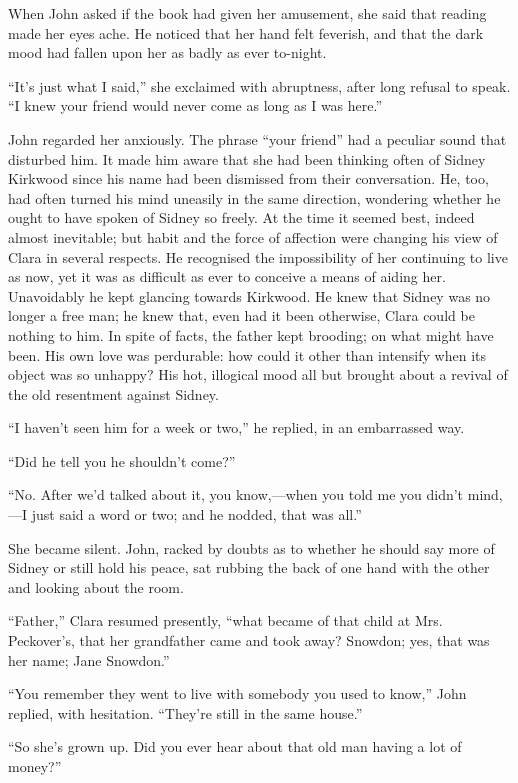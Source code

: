 When John asked if the book had given her amusement, she said that
reading made her eyes ache. He noticed that her hand felt feverish, and
that the dark mood had fallen upon her as badly as ever to-night.

``It's just what I said,'' she exclaimed with abruptness, after long
refusal to speak. ``I knew your friend would never come as long as I was
here.''

John regarded her anxiously. The phrase ``your friend'' had a peculiar
sound that disturbed him. It made him aware that she had {}been thinking
often of Sidney Kirkwood since his name had been dismissed from their
conversation. He, too, had often turned his mind uneasily in the same
direction, wondering whether he ought to have spoken of Sidney so
freely. At the time it seemed best, indeed almost inevitable; but habit
and the force of affection were changing his view of Clara in several
respects. He recognised the impossibility of her continuing to live as
now, yet it was as difficult as ever to conceive a means of aiding her.
Unavoidably he kept glancing towards Kirkwood. He knew that Sidney was
no longer a free man; he knew that, even had it been otherwise, Clara
could be nothing to him. In spite of facts, the father kept brooding; on
what might have been. His own love was perdurable: how could it other
than intensify when its object was so unhappy? His hot, illogical mood
all but brought about a revival of the old resentment against Sidney.

``I haven't seen him for a week or two,'' he replied, in an embarrassed
way.

``Did he tell you he shouldn't come?''

``No. After we'd talked about it, you know,---when you told me you
didn't mind,---I just {}said a word or two; and he nodded, that was
all.''

She became silent. John, racked by doubts as to whether he should say
more of Sidney or still hold his peace, sat rubbing the back of one hand
with the other and looking about the room.

``Father,'' Clara resumed presently, ``what became of that child at Mrs.
Peckover's, that her grandfather came and took away? Snowdon; yes, that
was her name; Jane Snowdon.''

``You remember they went to live with somebody you used to know,'' John
replied, with hesitation. ``They're still in the same house.''

``So she's grown up. Did you ever hear about that old man having a lot
of money?''

